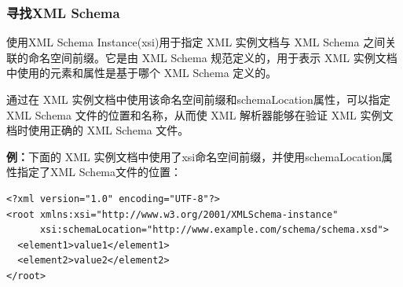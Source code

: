 \subsubsection{寻找XML Schema}
\begin{figure}[H]
	\setcounter{subfigure}{0}
	\centering
	\vspace{-1.5em}	
	\centering
	\vspace{-1em}
\end{figure}

使用XML Schema Instance(xsi)用于指定 XML 实例文档与 XML Schema 之间关联的命名空间前缀。它是由 XML Schema 规范定义的，用于表示 XML 实例文档中使用的元素和属性是基于哪个 XML Schema 定义的。

通过在 XML 实例文档中使用该命名空间前缀和schemaLocation属性，可以指定 XML Schema 文件的位置和名称，从而使 XML 解析器能够在验证 XML 实例文档时使用正确的 XML Schema 文件。

\textbf{例：}下面的 XML 实例文档中使用了xsi命名空间前缀，并使用schemaLocation属性指定了XML Schema文件的位置：
\begin{lstlisting}
<?xml version="1.0" encoding="UTF-8"?>
<root xmlns:xsi="http://www.w3.org/2001/XMLSchema-instance"
      xsi:schemaLocation="http://www.example.com/schema/schema.xsd">
  <element1>value1</element1>
  <element2>value2</element2>
</root>
\end{lstlisting}
